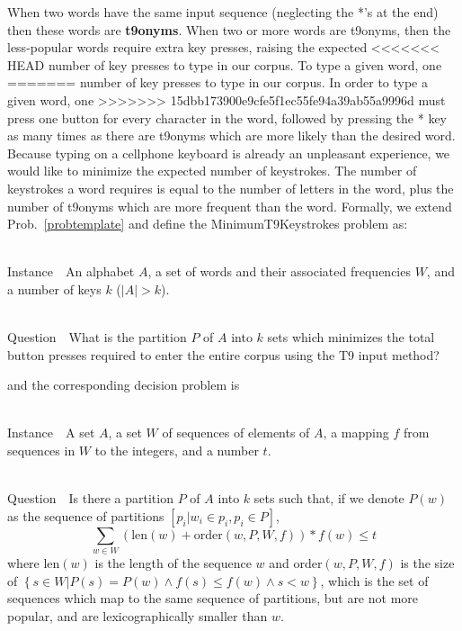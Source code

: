\documentclass[runningheads]{llncs}
\newcommand{\newword}[1]{{\bf #1}}
\newcommand{\Instance}{{\sc Instance~}}
\newcommand{\Question}{~\\
{\sc Question~}}
\begin{document}
\begin{prob}[{\sc
MinimumKeystrokes}]
When two words have the same input sequence (neglecting the *'s at the end)
then these words are \newword{t9onyms}.  When two or more words are t9onyms,
then the less-popular words require extra key presses, raising the expected
<<<<<<< HEAD
number of key presses to type in our corpus.  To type a given word, one
=======
number of key presses to type in our corpus.  In order to type a given word, one
>>>>>>> 15dbb173900e9cfe5f1ec55fe94a39ab55a9996d
must press one button for every character in the word, followed by pressing
the * key as many times as there are t9onyms which are more likely than the
desired word.  Because typing on a cellphone keyboard is already an unpleasant
experience, we would like to minimize the expected number of keystrokes.  The
number of keystrokes a word requires is equal to the number of letters in the
word, plus the number of t9onyms which are more frequent than the word.
Formally, we extend Prob.~\ref{probtemplate} and define the {\sc
MinimumT9Keystrokes} problem as:

\begin{prob}~\\
\label{thm:minstrokes}
\Instance\ An alphabet $A$, a set of words and their associated frequencies
$W$, and a number of keys $k$ ($|A| > k$).

\Question\ What is the partition $P$ of $A$ into $k$ sets which minimizes the
total button presses required to enter the entire corpus using the T9 input
method?
\end{prob}

and the corresponding decision problem is

\begin{prob}~\\
\label{minstrokesdecision}
\Instance\ A set $A$, a set $W$ of sequences of elements of $A$, a mapping $f$ from sequences in $W$ to the integers, and a number $t$.

\Question\ Is there a partition $P$ of $A$ into $k$ sets such that, if we denote $P(w)$ as the sequence of partitions $[p_i | w_i \in p_i, p_i \in P]$,
$$\sum_{w\in W} (\mathrm{len}(w)+\mathrm{order}(w,P,W,f)) * f(w) \le t$$
where len$(w)$ is the length of the sequence $w$ and order$(w,P,W,f)$ is the size of $\left\{s\in W | P(s) = P(w) \land f(s) \le f(w) \land s < w \right\}$, which is the set of sequences which map to the same sequence of partitions, but are not more popular, and are lexicographically smaller than $w$.
\end{prob}


\end{prob}
\end{document}
